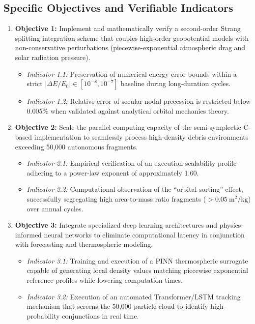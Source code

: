 \documentclass[11pt,letterpaper]{article}
\begin{document}
\subsection{Specific Objectives and Verifiable Indicators}
\begin{enumerate}
    \item \textbf{Objective 1:} Implement and mathematically verify a second-order Strang splitting integration scheme that couples high-order geopotential models with non-conservative perturbations (piecewise-exponential atmospheric drag and solar radiation pressure).
    \begin{itemize}
        \item \emph{Indicator 1.1:} Preservation of numerical energy error bounds within a strict $|\Delta E / E_0| \in [10^{-8}, 10^{-7}]$ baseline during long-duration cycles.
        \item \emph{Indicator 1.2:} Relative error of secular nodal precession is restricted below 0.005\% when validated against analytical orbital mechanics theory.
    \end{itemize}
    \item \textbf{Objective 2:} Scale the parallel computing capacity of the semi-symplectic C-based implementation to seamlessly process high-density debris environments exceeding 50,000 autonomous fragments.
    \begin{itemize}
        \item \emph{Indicator 2.1:} Empirical verification of an execution scalability profile adhering to a power-law exponent of approximately 1.60.
        \item \emph{Indicator 2.2:} Computational observation of the ``orbital sorting'' effect, successfully segregating high area-to-mass ratio fragments ($>0.05~\text{m}^2/\text{kg}$) over annual cycles.
    \end{itemize}
    \item \textbf{Objective 3:} Integrate specialized deep learning architectures and physics-informed neural networks to eliminate computational latency in conjunction with forecasting and thermospheric modeling.
    \begin{itemize}
        \item \emph{Indicator 3.1:} Training and execution of a PINN thermospheric surrogate capable of generating local density values matching piecewise exponential reference profiles while lowering computation times.
        \item \emph{Indicator 3.2:} Execution of an automated Transformer/LSTM tracking mechanism that screens the 50,000-particle cloud to identify high-probability conjunctions in real time.
    \end{itemize}
\end{enumerate}
\end{document}
